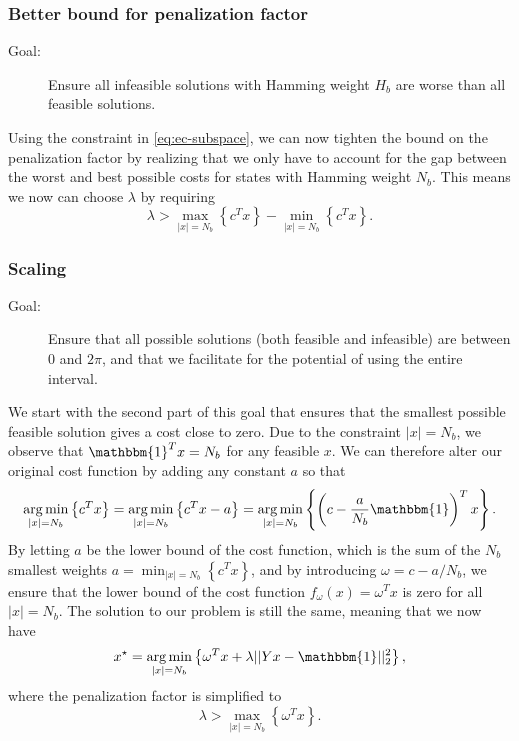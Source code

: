 \documentclass{article}
\newcommand{\argmin}{\operatorname*{arg\,min}}
\begin{document}
\subsubsection{Better bound for penalization factor}
\label{sec:ec-penalty}
\begin{description}
    \item[Goal:] Ensure all infeasible solutions with Hamming weight $H_b$ are worse than all feasible solutions.
\end{description}

Using the constraint in \eqref{eq:ec-subspace}, we can now tighten the bound on the penalization factor by realizing that we only have to account for the gap between the worst and best possible costs for states with Hamming weight $N_b$. This means we now can choose $\lambda$ by requiring
\begin{equation}
    \lambda >  \max_{|x| = N_b}\left\{ c^T x \right\}  - \min_{|x| = N_b}\left\{ c^T x \right\}.
    \label{eq:lambda-specific}
\end{equation}


\subsubsection{Scaling}
\label{sec:ec-scaled}
\begin{description}
    \item[Goal:]  Ensure that all possible solutions (both feasible and infeasible) are between 0 and $2\pi$, and that we facilitate for the potential of using the entire interval.
\end{description}
We start with the second part of this goal that ensures that the smallest possible feasible solution gives a cost close to zero. 
Due to the constraint $|x| = N_b$, we observe that $\mathbbm{1}^T x = N_b$ for any feasible $x$. We can therefore alter our original cost function by adding any constant $a$ so that
\begin{equation}
    \argmin_{|x| = N_b}\left\{ c^T x \right\} = \argmin_{|x| = N_b}\left\{ c^T x - a\right\} = \argmin_{|x| = N_b}\left\{ \left(c - \frac{a}{N_b}\mathbbm{1}\right)^T x \right\}.
    \label{eq:cost-scaling-1}
\end{equation}
By letting $a$ be the lower bound of the cost function, which is the sum of the $N_b$ smallest weights $a = \min_{|x| = N_b}\left\{ c^T x \right\}$, and by introducing $\omega = c - a/N_b$, we ensure that the lower bound of the cost function $f_{\omega}(x) = \omega^T x$ is zero for all $|x| = N_b$.
The solution to our problem is still the same, meaning that we now have
\begin{equation}
    x^\star = \argmin_{ |x| = N_b} \left\{ \omega^T x + \lambda ||Y x - \mathbbm{1}||_2^2 \right\},
    \label{eq:cost-scaling-2}
\end{equation}
where the penalization factor is simplified to
\begin{equation}
    \lambda > \max_{|x| = N_b}\left\{ \omega^T x \right\}.
    \label{eq:scaling-penalty-1}
\end{equation}
\end{document}
